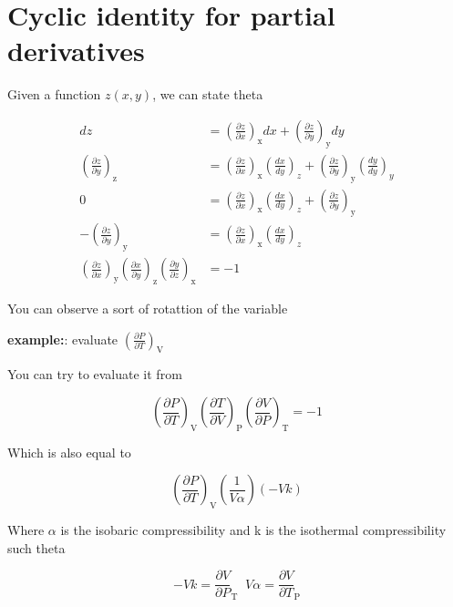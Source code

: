 \section{Cyclic identity for partial derivatives}

Given a function $z(x,y)$, we can state theta

\begin{align*}
    dz &= \left(\frac{\partial z}{\partial x}\right)_{\textrm{x}} dx + 
        \left(\frac{\partial z}{\partial y}\right)_{\textrm{y}} dy \\
    \left(\frac{\partial z}{\partial y}\right)_{\textrm{z}} &= \left(\frac{\partial z}{\partial x}\right)_{\textrm{x}} \left(\frac{dx}{dy}\right)_z + 
        \left(\frac{\partial z}{\partial y}\right)_{\textrm{y}} \left(\frac{dy}{dy}\right)_y \\
    0 &= \left(\frac{\partial z}{\partial x}\right)_{\textrm{x}} \left(\frac{dx}{dy}\right)_z + 
        \left(\frac{\partial z}{\partial y}\right)_{\textrm{y}} \\
    -\left(\frac{\partial z}{\partial y}\right)_{\textrm{y}} &= \left(\frac{\partial z}{\partial x}\right)_{\textrm{x}} \left(\frac{dx}{dy}\right)_z \\
    \left(\frac{\partial z}{\partial x}\right)_{\textrm{y}} \left(\frac{\partial x}{\partial y}\right)_{\textrm{z}} \left(\frac{\partial y}{\partial z}\right)_{\textrm{x}} &= -1
\end{align*}

You can observe a sort of rotattion of the variable

\textbf{example:}: evaluate $\left(\frac{\partial P}{\partial T}\right)_{\textrm{V}}$

You can try to evaluate it from

$$
\left(\frac{\partial P}{\partial T}\right)_{\textrm{V}}
\left(\frac{\partial T}{\partial V}\right)_{\textrm{P}}
\left(\frac{\partial V}{\partial P}\right)_{\textrm{T}}
= -1
$$  

Which is also equal to

$$
\left(\frac{\partial P}{\partial T}\right)_{\textrm{V}}
\left(\frac{1}{V \alpha}\right)
(- V k)
$$

Where $\alpha$ is the isobaric compressibility and k is the isothermal compressibility such theta

$$
- Vk = \frac{\partial V}{\partial P}_{\textrm{T}}
\;\;
V \alpha = \frac{\partial V}{\partial T}_{\textrm{P}}
$$